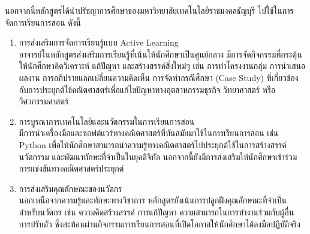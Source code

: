 	


%

นอกจากนี้หลักสูตรได้นำปรัชญาการศึกษาของมหาวิทยาลัยเทคโนโลยีราชมงคลธัญบุรี ไปใช้ในการจัดการเรียนการสอน  ดังนี้
\begin{enumerate}
	\item การส่งเสริมการจัดการเรียนรู้แบบ Active Learning  \\อาจารย์ในหลักสูตรส่งเสริมการเรียนรู้ที่เน้นให้นักศึกษาเป็นศูนย์กลาง มีการจัดกิจกรรมที่กระตุ้นให้นักศึกษาคิดวิเคราะห์ แก้ปัญหา และสร้างสรรค์สิ่งใหม่ๆ เช่น การทำโครงงานกลุ่ม การนำเสนอผลงาน การอภิปรายแลกเปลี่ยนความคิดเห็น การจัดทำกรณีศึกษา (Case Study) ที่เกี่ยวข้องกับการประยุกต์ใช้คณิตศาสตร์เพื่อแก้ไขปัญหาทางอุตสาหกรรมธุรกิจ วิทยาศาสตร์ หรือวิศวกรรมศาสตร์
	\item การบูรณาการเทคโนโลยีและนวัตกรรมในการเรียนการสอน \\มีการนำเครื่องมือและซอฟต์แวร์ทางคณิตศาสตร์ที่ทันสมัยมาใช้ในการเรียนการสอน เช่น Python เพื่อให้นักศึกษาสามารถนำความรู้ทางคณิตศาสตร์ไปประยุกต์ใช้ในการสร้างสรรค์นวัตกรรม และพัฒนาทักษะที่จำเป็นในยุคดิจิทัล นอกจากนี้ยังมีการส่งเสริมให้นักศึกษาเข้าร่วมการแข่งขันทางคณิตศาสตร์ประยุกต์
	\item การส่งเสริมคุณลักษณะของนวัตกร \\นอกเหนือจากความรู้และทักษะทางวิชาการ หลักสูตรยังเน้นการปลูกฝังคุณลักษณะที่จำเป็นสำหรับนวัตกร เช่น ความคิดสร้างสรรค์ การแก้ปัญหา ความสามารถในการทำงานร่วมกับผู้อื่น การปรับตัว ซึ่งสะท้อนผ่านกิจกรรมการเรียนการสอนที่เปิดโอกาสให้นักศึกษาได้ลงมือปฏิบัติจริง  
\end{enumerate}


\begin{doclist}
\end{doclist}

